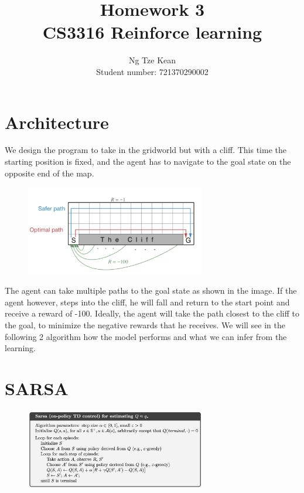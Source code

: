 \documentclass{article}
\title{Homework 3\\CS3316 Reinforce learning}
\author{Ng Tze Kean\\Student number: 721370290002}
\begin{document}
\maketitle

\begin{titlepage}
\end{titlepage}

\section*{Architecture}

We design the program to take in the gridworld but with a cliff. This time the
starting position is fixed, and the agent has to navigate to the goal state on
the opposite end of the map.

\begin{figure}[h]
    \centering
    \includegraphics[width=0.7\textwidth]{image.png}
\end{figure}

The agent can take multiple paths to the goal state as shown in the image. If
the agent however, steps into the cliff, he will fall and return to the start
point and receive a reward of -100. Ideally, the agent will take the path closest
to the cliff to the goal, to minimize the negative rewards that he receives. We
will see in the following 2 algorithm how the model performs and what we can infer
from the learning.

\section*{SARSA}

\begin{figure}[h]
    \centering
    \includegraphics[width=0.7\textwidth]{image-1.png}
\end{figure}
\end{document}
